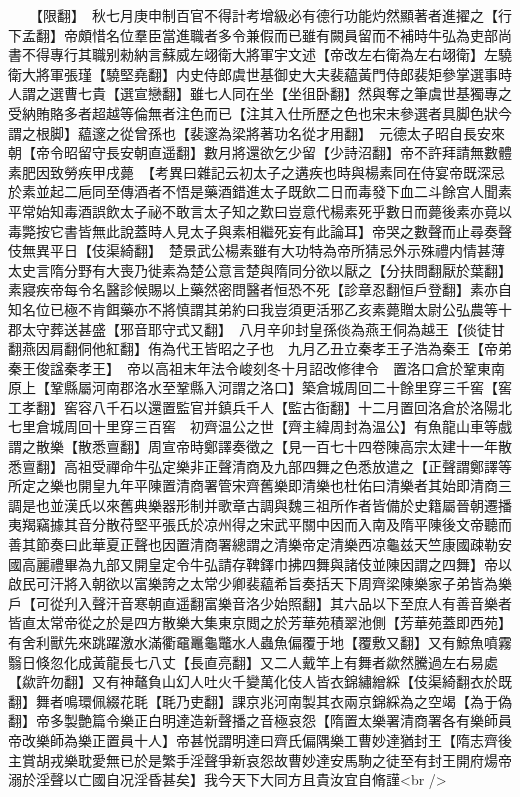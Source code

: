　　【限翻】　秋七月庚申制百官不得計考增級必有德行功能灼然顯著者進擢之【行下孟翻】帝頗惜名位羣臣當進職者多令兼假而已雖有闕員留而不補時牛弘為吏部尚書不得專行其職别勑納言蘇威左翊衛大將軍宇文述【帝改左右衛為左右翊衛】左驍衛大將軍張瑾【驍堅堯翻】内史侍郎虞世基御史大夫裴藴黃門侍郎裴矩參掌選事時人謂之選曹七貴【選宣戀翻】雖七人同在坐【坐徂卧翻】然與奪之筆虞世基獨專之受納賄賂多者超越等倫無者注色而已【注其入仕所歷之色也宋末參選者具脚色狀今謂之根脚】藴邃之從曾孫也【裴邃為梁將著功名從才用翻】　元德太子昭自長安來朝【帝令昭留守長安朝直遥翻】數月將還欲乞少留【少詩沼翻】帝不許拜請無數體素肥因致勞疾甲戌薨　【考異曰雜記云初太子之遘疾也時與楊素同在侍宴帝既深忌於素並起二巵同至傳酒者不悟是藥酒錯進太子既飲二日而毒發下血二斗餘宫人聞素平常始知毒酒誤飲太子祕不敢言太子知之歎曰豈意代楊素死乎數日而薨後素亦竟以毒斃按它書皆無此說蓋時人見太子與素相繼死妄有此論耳】帝哭之數聲而止尋奏聲伎無異平日【伎渠綺翻】　楚景武公楊素雖有大功特為帝所猜忌外示殊禮内情甚薄太史言隋分野有大喪乃徙素為楚公意言楚與隋同分欲以厭之【分扶問翻厭於葉翻】素寢疾帝每令名醫診候賜以上藥然密問醫者恒恐不死【診章忍翻恒戶登翻】素亦自知名位已極不肯餌藥亦不將慎謂其弟約曰我豈須更活邪乙亥素薨贈太尉公弘農等十郡太守葬送甚盛【邪音耶守式又翻】　八月辛卯封皇孫倓為燕王侗為越王【倓徒甘翻燕因肩翻侗他紅翻】侑為代王皆昭之子也　九月乙丑立秦孝王子浩為秦王【帝弟秦王俊諡秦孝王】　帝以高祖末年法令峻刻冬十月詔改修律令　置洛口倉於鞏東南原上【鞏縣屬河南郡洛水至鞏縣入河謂之洛口】築倉城周回二十餘里穿三千窖【窖工孝翻】窖容八千石以還置監官并鎮兵千人【監古衘翻】十二月置回洛倉於洛陽北七里倉城周回十里穿三百窖　初齊温公之世【齊主緯周封為温公】有魚龍山車等戲謂之散樂【散悉亶翻】周宣帝時鄭譯奏徵之【見一百七十四卷陳高宗太建十一年散悉亶翻】高祖受禪命牛弘定樂非正聲清商及九部四舞之色悉放遣之【正聲謂鄭譯等所定之樂也開皇九年平陳置清商署管宋齊舊樂即清樂也杜佑曰清樂者其始即清商三調是也並漢氏以來舊典樂器形制并歌章古調與魏三祖所作者皆備於史籍屬晉朝遷播夷羯竊據其音分散苻堅平張氏於凉州得之宋武平關中因而入南及隋平陳後文帝聽而善其節奏曰此華夏正聲也因置清商署總謂之清樂帝定清樂西凉龜兹天竺康國疎勒安國高麗禮畢為九部又開皇定令牛弘請存鞞鐸巾拂四舞與諸伎並陳因謂之四舞】帝以啟民可汗將入朝欲以富樂誇之太常少卿裴藴希旨奏括天下周齊梁陳樂家子弟皆為樂戶【可從刋入聲汗音寒朝直遥翻富樂音洛少始照翻】其六品以下至庶人有善音樂者皆直太常帝從之於是四方散樂大集東京閲之於芳華苑積翠池側【芳華苑蓋即西苑】有舍利獸先來跳躍激水滿衢黿鼉龜鼈水人蟲魚偏覆于地【覆敷又翻】又有鯨魚噴霧翳日倏忽化成黃龍長七八丈【長直亮翻】又二人戴竿上有舞者歘然騰過左右易處【歘許勿翻】又有神鼇負山幻人吐火千變萬化伎人皆衣錦繡繒綵【伎渠綺翻衣於既翻】舞者鳴環佩綴花毦【毦乃吏翻】課京兆河南製其衣兩京錦綵為之空竭【為于偽翻】帝多製艶篇令樂正白明達造新聲播之音極哀怨【隋置太樂署清商署各有樂師員帝改樂師為樂正置員十人】帝甚悦謂明達曰齊氏偏隅樂工曹妙達猶封王【隋志齊後主賞胡戎樂耽愛無已於是繁手淫聲爭新哀怨故曹妙達安馬駒之徒至有封王開府煬帝溺於淫聲以亡國自况淫昏甚矣】我今天下大同方且貴汝宜自脩謹<br />
